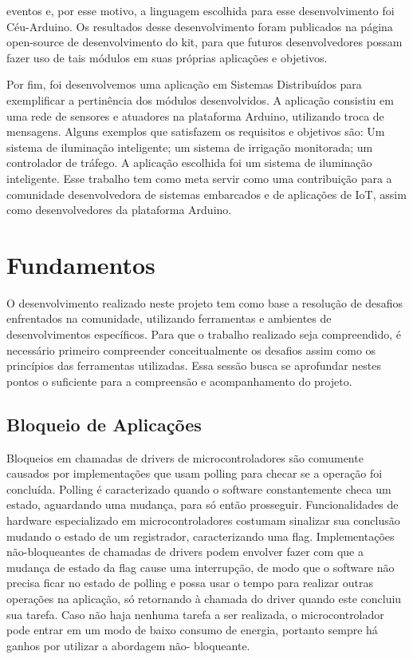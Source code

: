 \documentclass{article}
\begin{document}
eventos e, por esse motivo, a linguagem escolhida para esse desenvolvimento foi Céu-Arduino. Os
resultados desse desenvolvimento foram publicados na página open-source de desenvolvimento do
kit, para que futuros desenvolvedores possam fazer uso de tais módulos em suas próprias aplicações
e objetivos.
\par Por fim, foi desenvolvemos uma aplicação em Sistemas Distribuídos para exemplificar a pertinência
dos módulos desenvolvidos. A aplicação consistiu em uma rede de sensores e atuadores na
plataforma Arduino, utilizando troca de mensagens. Alguns exemplos que satisfazem
os requisitos e objetivos são: Um sistema de iluminação inteligente; um sistema de irrigação
monitorada; um controlador de tráfego. A aplicação escolhida foi um sistema de iluminação inteligente. Esse trabalho tem como meta servir como uma contribuição
para a comunidade desenvolvedora de sistemas embarcados e de aplicações de IoT, assim como
desenvolvedores da plataforma Arduino. \cite{wortmann2015} \cite{chui2010} \cite{edwards1997} \cite{githubceu} \cite{atmegadatasheet}

\section{Fundamentos}

\tab O desenvolvimento realizado neste projeto tem como base a resolução de desafios enfrentados na comunidade, utilizando ferramentas e ambientes de desenvolvimentos específicos. Para que o trabalho realizado seja compreendido, é necessário primeiro compreender conceitualmente os desafios assim como os princípios das ferramentas utilizadas. Essa sessão busca se aprofundar nestes pontos o suficiente para a compreensão e acompanhamento do projeto. 

\subsection{Bloqueio de Aplicações}

\tab Bloqueios em chamadas de drivers de microcontroladores são comumente causados por implementações que usam polling para checar se a operação foi concluída. Polling é caracterizado
quando o software constantemente checa um estado, aguardando uma mudança, para só então
prosseguir. Funcionalidades de hardware especializado em microcontroladores costumam sinalizar sua
conclusão mudando o estado de um registrador, caracterizando uma flag. Implementações não-bloqueantes de chamadas de drivers podem envolver fazer com que a mudança de estado da flag cause
uma interrupção, de modo que o software não precisa ficar no estado de polling e possa usar o tempo
para realizar outras operações na aplicação, só retornando à chamada do driver quando este concluiu
sua tarefa. Caso não haja nenhuma tarefa a ser realizada, o microcontrolador pode entrar em um
modo de baixo consumo de energia, portanto sempre há ganhos por utilizar a abordagem não-
bloqueante.
\end{document}

